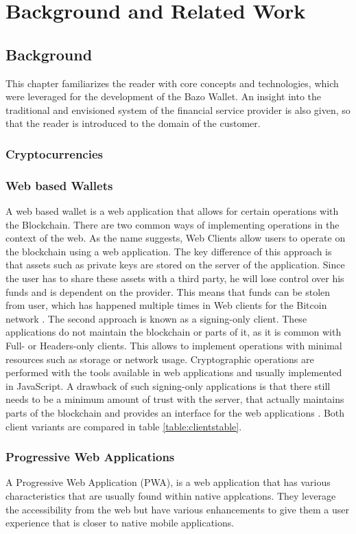 \chapter{Background and Related Work}
\section{Background}
This chapter familiarizes the reader with core concepts and technologies, which were leveraged for the development of the Bazo Wallet. An insight into the traditional and envisioned system of the financial service provider is also given, so that the reader is introduced to the domain of the customer.
\subsection{Cryptocurrencies}
\subsection{Web based Wallets}
A web based wallet is a web application that allows for certain operations with the Blockchain. There are two common ways of implementing operations in the context of the web.
As the name suggests, Web Clients allow users to operate on the blockchain using a web application. The key difference of this approach is that assets such as private keys are stored on the server of the application. Since the user has to share these assets with a third party, he will lose control over his funds and is dependent on the provider. This means that funds can be stolen from user, which has happened multiple times in Web clients for the Bitcoin network \cite{masteringbitcoin}.
The second approach is known as a signing-only client. These applications do not maintain the blockchain or parts of it, as it is common with Full- or Headers-only clients. This allows to implement operations with minimal resources such as storage or network usage. Cryptographic operations are performed with the tools available in web applications and usually implemented in JavaScript.
A drawback of such signing-only applications is that there still needs to be a minimum amount of trust with the server, that actually maintains parts of the blockchain and provides an interface for the web applications \cite{bitcoinclients}.
Both client variants are compared in table \ref{table:clientstable}.
\subsection{Progressive Web Applications}
A Progressive Web Application (PWA), is a web application that has various characteristics that are usually found within native applcations.
They leverage the accessibility from the web but have various enhancements to give them a user experience that is closer to native mobile applications.

